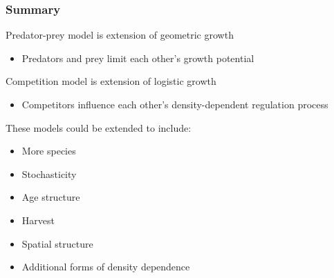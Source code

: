 \documentclass[color=usenames,dvipsnames]{beamer}\usepackage[]{graphicx}\usepackage[]{color}
\begin{document}
\begin{frame}
  \frametitle{Summary}
  \large
  Predator-prey model is extension of geometric growth
    \begin{itemize}
      \item Predators and prey limit each other's growth potential
    \end{itemize}
    \pause \vfill
    Competition model is extension of logistic growth
    \begin{itemize}
      \item Competitors influence each other's density-dependent
        regulation process
    \end{itemize}
    \pause \vfill
    These models could be extended to include:
    \begin{itemize}%
    \item More species
    \item Stochasticity
    \item Age structure
    \item Harvest
    \item Spatial structure
    \item Additional forms of density dependence
    \end{itemize}
\end{frame}










\end{document}
